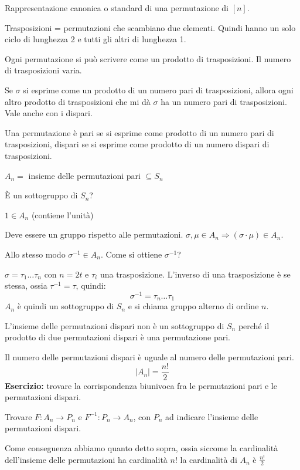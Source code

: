 Rappresentazione canonica o standard di una permutazione di $[n]$.

Trasposizioni = permutazioni che scambiano due elementi. Quindi hanno un solo ciclo di lunghezza 2 e tutti gli altri di lunghezza 1.

\begin{theorem}
Ogni permutazione si pu\`o scrivere come un prodotto di trasposizioni. Il numero di trasposizioni varia.
\end{theorem}

Se $\sigma$ si esprime come un prodotto di un numero pari di trasposizioni, allora ogni altro prodotto di trasposizioni che mi d\`a $\sigma$ ha un numero pari di trasposizioni. Vale anche con i dispari.

\begin{defn}
Una permutazione \`e pari se si esprime come prodotto di un numero pari di trasposizioni, dispari se si esprime come prodotto di un numero dispari di trasposizioni.
\end{defn}

$A_n =$ insieme delle permutazioni pari $\subseteq S_n$

\`E un sottogruppo di $S_n$?

$1 \in A_n$ (contiene l'unit\`a)

Deve essere un gruppo rispetto alle permutazioni. $\sigma, \mu \in A_n \Rightarrow (\sigma \cdot \mu) \in A_n$.

Allo stesso modo $\sigma^{-1} \in A_n$. Come si ottiene $\sigma^{-1}$?

$\sigma = \tau_{1} \dots \tau_{n}$ con $n = 2t$ e $\tau_i$ una trasposizione. L'inverso di una trasposizione \`e se stessa, ossia $\tau^{-1} = \tau$, quindi:
\[
\sigma^{-1} = \tau_n \dots \tau_1
\]
$A_n$ \`e quindi un sottogruppo di $S_n$ e si chiama gruppo alterno di ordine \label{gruppo_alterno} $n$.

L'insieme delle permutazioni dispari non \`e un sottogruppo di $S_n$ perch\'e il prodotto di due permutazioni dispari \`e una permutazione pari.

Il numero delle permutazioni dispari \`e uguale al numero delle permutazioni pari.
\[
|A_n| = \frac{n!}{2}
\]
\textbf{Esercizio:} trovare la corrispondenza biunivoca fra le permutazioni pari e le permutazioni dispari.

Trovare $F : A_n \to P_n$ e $F^{-1} : P_n \to A_n$, con $P_n$ ad indicare l'insieme delle permutazioni dispari.

Come conseguenza abbiamo quanto detto sopra, ossia siccome la cardinalit\`a dell'insieme delle permutazioni ha cardinalit\`a $n!$ la cardinalit\`a di $A_n$ \`e $\frac{n!}{2}$

